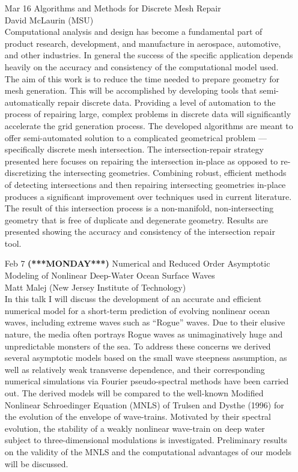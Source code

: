 \documentclass[12]{article}
\begin{document}
\begin{enumerate}
\item[Mar 16]Algorithms and Methods for Discrete Mesh Repair\\David McLaurin (MSU)\\
Computational analysis and design has become a fundamental part of product research, development, and manufacture in aerospace, automotive, and other industries.  In general the success of the specific application depends heavily on the accuracy and consistency of the computational model used.  The aim of this work is to reduce the time needed to prepare geometry for mesh generation.  This will be accomplished by developing tools that semi-automatically repair discrete data.  Providing a level of automation to the process of repairing large, complex problems in discrete data will significantly accelerate the grid generation process.  The developed algorithms are meant to offer semi-automated solution to a complicated geometrical problem — specifically discrete mesh intersection.
The intersection-repair strategy presented here focuses on repairing the intersection in-place as opposed to re-discretizing the intersecting geometries.  Combining robust, efficient methods of detecting intersections and then repairing intersecting geometries in-place produces a significant improvement over techniques used in current literature.  The result of this intersection process is a non-manifold, non-intersecting geometry that is free of duplicate and degenerate geometry.  Results are presented showing the accuracy and consistency of the intersection repair tool.

\item[Feb 7 {\bf (***MONDAY***)}]Numerical and Reduced Order Asymptotic Modeling of Nonlinear Deep-Water Ocean Surface Waves\\ Matt Malej (New Jersey Institute of Technology) \\ In this talk I will discuss the development of an accurate and efficient numerical model for a short-term prediction of evolving nonlinear ocean waves, including extreme waves such as ``Rogue'' waves. Due to their elusive nature, the media often portrays Rogue waves as unimaginatively huge and unpredictable monsters of the sea. To address these concerns we derived several asymptotic models based on the small wave steepness assumption, as well as relatively weak transverse dependence, and their corresponding numerical simulations via Fourier pseudo-spectral methods have been carried out. 
The derived models will be compared to the well-known Modified Nonlinear Schroedinger Equation (MNLS) of Trulsen and Dysthe (1996) for the evolution of the envelope of wave-trains. Motivated by their spectral evolution, the stability of a weakly nonlinear wave-train on deep water subject to three-dimensional modulations is investigated. Preliminary results on the validity of the MNLS and the computational advantages of our models will be discussed.


\end{enumerate}
\end{document}
